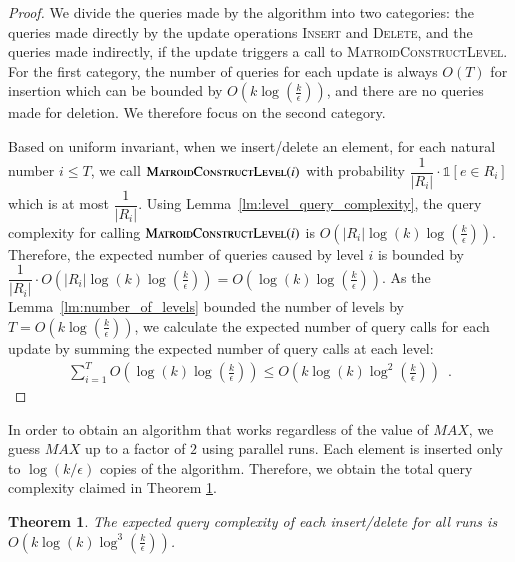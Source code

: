 \documentclass[11pt]{article}
\newtheorem{theorem}{Theorem}
\newcommand{\mO}{O}
\newcommand{\ind}[1]{\ensuremath{\mathds{1}\left[#1\right]}}
\newcommand{\MatroidConstLevel}{\textsc{MatroidConstructLevel}}
\newcommand{\insertv}{{\textsc{Insert}}}
\newcommand{\deletev}{{\textsc{Delete}}}
\begin{document}
\begin{proof}
  We divide the queries made by the algorithm into two categories:
  the queries made directly by the update operations \insertv{} and \deletev{}, and the queries made indirectly, if the update triggers a call to \MatroidConstLevel{}. For the first category, the number of queries for each update is always $O(T)$ for insertion which can be bounded by $O\left(
  k\log\left(\frac{k}{\epsilon}\right)\right)$, and there are no queries made for deletion. We therefore focus on the second category.
  
  Based on uniform invariant, when we insert/delete an element, for each
  natural number $i \le T$, we call $\MatroidConstLevel{}(i)$ with probability
  $\dfrac{1}{|R_i|} \cdot \ind{e \in R_i}$ which is at most $\dfrac{1}{|R_i|}$.
  Using Lemma~\ref{lm:level_query_complexity}, the query complexity for calling
  $\MatroidConstLevel{}(i)$ is
  $\mO\left(|R_i|\log(k)\log\left(\frac{k}{\epsilon}\right)\right)$. Therefore,
  the expected number of queries caused by level $i$ is bounded by
  $\dfrac{1}{|R_i|}
  \cdot\mO\left(|R_i|\log(k)\log\left(\frac{k}{\epsilon}\right)\right) =
  \mO\left(\log(k)\log\left(\frac{k}{\epsilon}\right)\right)$. As the
  Lemma~\ref{lm:number_of_levels} bounded the number of levels by $T = O\left(
  k\log\left(\frac{k}{\epsilon}\right)\right)$, we calculate the expected
  number of query calls for each update by summing the expected number of query
  calls at each level:
  \begin{align*}
      \sum_{i=1}^T \mO\left(\log(k)\log\left(\frac{k}{\epsilon}\right)\right) \le \mO\left(k\log(k)\log^2\left(\frac{k}{\epsilon}\right)\right) \enspace.
  \end{align*}
\end{proof}

In order to obtain an algorithm that works regardless of the value of $MAX$, we guess $MAX$ up to a factor of $2$ using parallel runs.
Each element is inserted only to $\log(k/\epsilon)$ copies of the algorithm. Therefore, we obtain the total query complexity claimed in Theorem \ref{thm:matroid:query_complexity}.

\begin{theorem}
\label{thm:matroid:query_complexity}
  The expected query complexity of each insert/delete for all runs is $\mO\left(k\log(k)\log^3\left(\frac{k}{\epsilon}\right)\right)$.
\end{theorem}
\end{document}
